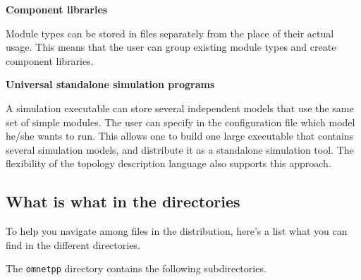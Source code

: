 \textbf{Component libraries}

Module types can be stored in files separately from the place 
of their actual usage. This means that the user can group existing 
module types and create component libraries.


\textbf{Universal standalone simulation programs}


A simulation executable can store several independent models 
that use the same set of simple modules. The user can specify 
in the configuration file which model he/she wants to run. This 
allows one to build one large executable that contains several 
simulation models, and distribute it as a standalone simulation 
tool. The flexibility of the topology description language also 
supports this approach.


\subsection{What is what in the directories}

To help you navigate among files in the {\opp} distribution, 
here's a list what you can find in the different directories.

The \texttt{omnetpp} directory contains the following subdirectories.


